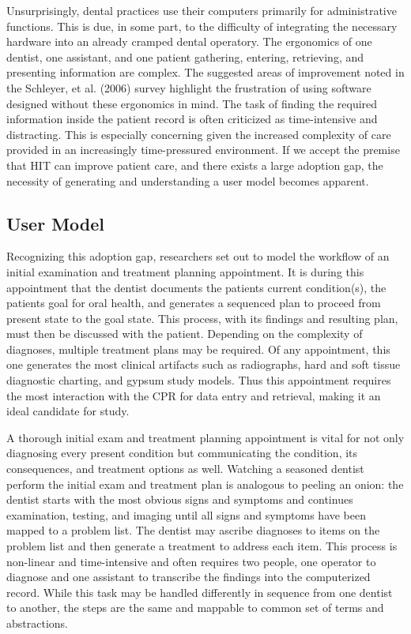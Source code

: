 \documentclass[11pt]{article}
\begin{document}
Unsurprisingly, dental practices use their computers primarily for administrative functions. This is due, in some part, to the difficulty of integrating the necessary hardware into an already cramped dental operatory.\cite{Schleyer2004Why-integration} The ergonomics of one dentist, one assistant, and one patient gathering, entering, retrieving, and presenting information are complex. The suggested areas of improvement noted in the Schleyer, et al. (2006) survey highlight the frustration of using software designed without these ergonomics in mind. The task of finding the required information inside the patient record is often criticized as time-intensive and distracting.\cite{Nygren1998Helping-clinici} This is especially concerning given the increased complexity of care provided in an increasingly time-pressured environment. If we accept the premise that HIT can improve patient care, and there exists a large adoption gap, the necessity of generating and understanding a user model becomes apparent.

\subsection{User Model}
Recognizing this adoption gap, researchers set out to model the workflow of an initial examination and treatment planning appointment.\cite{Irwin2009A-preliminary-m} It is during this appointment that the dentist documents the patients current condition(s), the patients goal for oral health, and generates a sequenced plan to proceed from present state to the goal state. This process, with its findings and resulting plan, must then be discussed with the patient. Depending on the complexity of diagnoses, multiple treatment plans may be required. Of any appointment, this one generates the most clinical artifacts such as radiographs, hard and soft tissue diagnostic charting,  and gypsum study models. Thus this appointment requires the most interaction with the CPR for data entry and retrieval, making it an ideal candidate for study. 

A thorough initial exam and treatment planning appointment is vital for not only diagnosing every present condition but communicating the condition, its consequences, and treatment options as well. Watching a seasoned dentist perform the initial exam and treatment plan is analogous to peeling an onion: the dentist starts with the most obvious signs and symptoms and continues examination, testing, and imaging until all signs and symptoms have been mapped to a problem list. The dentist may ascribe diagnoses to items on the problem list and then generate a treatment to address each item. This process is non-linear and time-intensive and often requires two people, one operator to diagnose and one assistant to transcribe the findings into the computerized record. While this task may be handled differently in sequence from one dentist to another, the steps are the same and mappable to common set of terms and abstractions.
\end{document}

